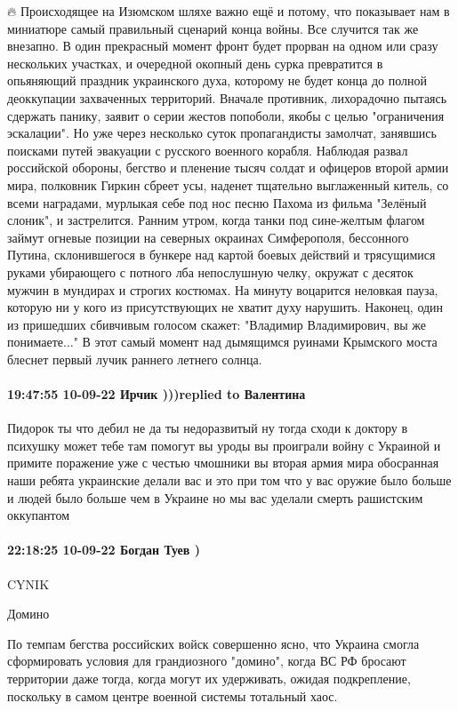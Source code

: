 🔥 Происходящее на Изюмском шляхе важно ещё и потому, что показывает нам в
миниатюре самый правильный сценарий конца войны. Все случится так же внезапно.
В один прекрасный момент фронт будет прорван на одном или сразу нескольких
участках, и очередной окопный день сурка превратится в опьяняющий праздник
украинского духа, которому не будет конца до полной деоккупации захваченных
территорий. Вначале противник, лихорадочно пытаясь сдержать панику, заявит о
серии жестов попоболи, якобы с целью "ограничения эскалации". Но уже через
несколько суток пропагандисты замолчат, занявшись поисками путей эвакуации с
русского военного корабля. Наблюдая развал российской обороны, бегство и
пленение тысяч солдат и офицеров второй армии мира, полковник Гиркин сбреет
усы, наденет тщательно выглаженный китель, со всеми наградами, мурлыкая себе
под нос песню Пахома из фильма "Зелёный слоник", и застрелится. Ранним утром,
когда танки под сине-желтым флагом займут огневые позиции на северных окраинах
Симферополя, бессонного Путина, склонившегося в бункере над картой боевых
действий и трясущимися руками убирающего с потного лба непослушную челку,
окружат с десяток мужчин в мундирах и строгих костюмах. На минуту воцарится
неловкая пауза, которую ни у кого из присутствующих не хватит духу нарушить.
Наконец, один из пришедших сбивчивым голосом скажет: "Владимир Владимирович, вы
же понимаете..." В этот самый момент над дымящимся руинами Крымского моста
блеснет первый лучик раннего летнего солнца.

\paragraph{19:47:55 10-09-22 Ирчик )))replied to Валентина}

Пидорок ты что дебил не да ты недоразвитый ну тогда сходи к доктору в психушку
может тебе там помогут вы уроды вы проиграли войну с Украиной и примите
поражение уже с честью чмошники вы вторая армия мира обосранная наши ребята
украинские делали вас и это при том что у вас оружие было больше и людей было
больше чем в Украине но мы вас уделали смерть рашистским оккупантом🤣🤣🤣


\paragraph{22:18:25 10-09-22 Богдан Туев )}
CYNIK

Домино

По темпам бегства российских войск совершенно ясно, что Украина смогла
сформировать условия для грандиозного "домино", когда ВС РФ бросают территории
даже тогда, когда могут их удерживать, ожидая подкрепление, поскольку в самом
центре военной системы тотальный хаос.

